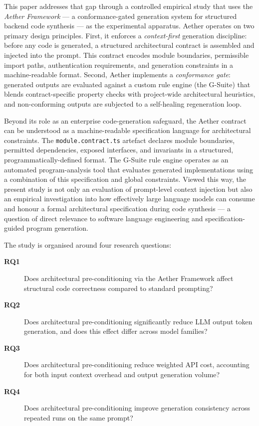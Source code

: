 \documentclass[review,12pt,3p]{elsarticle}
\begin{document}
This paper addresses that gap through a controlled empirical study that uses the
\emph{Aether Framework} --- a conformance-gated generation system for structured backend
code synthesis --- as the experimental apparatus. Aether operates on two primary design
principles.
First, it enforces a \emph{context-first} generation discipline: before any code is
generated, a structured architectural contract is assembled and injected into the prompt.
This contract encodes module boundaries, permissible import paths, authentication
requirements, and generation constraints in a machine-readable format. Second, Aether
implements a \emph{conformance gate}: generated outputs are evaluated against a custom
rule engine (the G-Suite) that blends contract-specific property checks with project-wide
architectural heuristics, and non-conforming outputs are subjected to a self-healing
regeneration loop.

Beyond its role as an enterprise code-generation safeguard, the Aether contract can be
understood as a machine-readable specification language for architectural constraints. The
\texttt{module.contract.ts} artefact declares module boundaries, permitted dependencies,
exposed interfaces, and invariants in a structured, programmatically-defined format. The
G-Suite rule engine operates as an automated program-analysis tool that evaluates generated
implementations using a combination of this specification and global constraints.
Viewed this way, the present study is not only
an evaluation of prompt-level context injection but also an empirical investigation into how
effectively large language models can consume and honour a formal architectural specification
during code synthesis --- a question of direct relevance to software language engineering and
specification-guided program generation.

The study is organised around four research questions:

\begin{description}
  \item[\textbf{RQ1}] Does architectural pre-conditioning via the Aether Framework affect
    structural code correctness compared to standard prompting?
  \item[\textbf{RQ2}] Does architectural pre-conditioning significantly reduce LLM output
    token generation, and does this effect differ across model families?
  \item[\textbf{RQ3}] Does architectural pre-conditioning reduce weighted API cost,
    accounting for both input context overhead and output generation volume?
  \item[\textbf{RQ4}] Does architectural pre-conditioning improve generation consistency
    across repeated runs on the same prompt?
\end{description}
\end{document}
